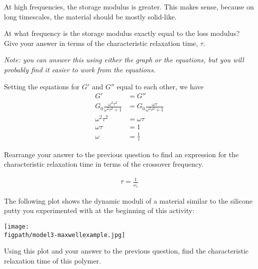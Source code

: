 \begin{activity}
\begin{ctqs}
\begin{enumerate}
\begin{solution}[1.1in]
						At high frequencies, the storage modulus is greater.  This makes sense, because on long timescales, the material should be mostly solid-like.
					\end{solution}
	\end{enumerate}

	\question At what frequency is the storage modulus exactly equal to the loss modulus?  Give your answer in terms of the characteristic relaxation time, $\tau$.
	
		\emph{Note: you can answer this using either the graph or the equations, but you will probably find it easier to work from the equations.}
	
					\begin{solution}[1.75in]
					
						Setting the equations for $G'$ and $G''$ equal to each other, we have
						\begin{align*}
							G' &= G''\\
							G_0 \frac{\omega^2 \tau^2}{\omega^2 \tau^2 + 1} &= G_0 \frac{\omega \tau}{\omega^2 \tau^2 + 1}\\
							\omega^2 \tau^2 &= \omega \tau\\
							\omega\tau &= 1\\
							\omega &= \frac{1}{\tau}
						\end{align*}
					\end{solution}
	
	\question Rearrange your answer to the previous question to find an expression for the characteristic relaxation time in terms of the crossover frequency.
	
					\begin{solution}[1in]
					
						\begin{align*}
							\tau = \frac{1}{\omega_c}
						\end{align*}
					\end{solution}
	
	\question The following plot shows the dynamic moduli of a material similar to the silicone putty you experimented with at the beginning of this activity:
				
		\centerline{\texttt{[image: \\figpath/model3-maxwellexample.jpg]}}
		
			Using this plot and your answer to the previous question, find the characteristic relaxation time of this polymer.
	
					\begin{solution}[1.5in]
					

\end{solution}
\end{ctqs}
\end{activity}
